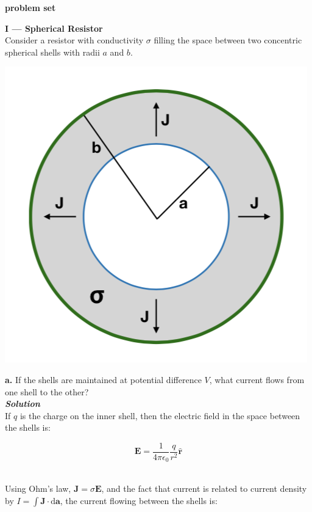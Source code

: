 \documentclass[9pt]{extarticle}
\renewcommand{\v}[1]{{\bm #1}}
\newcommand{\hv}[1]{\hat{\bm{#1}}}
\newcommand{\bfit}[1]{\textbf{\textit{#1}}}
\renewcommand{\d}{\text{d}}
\newcommand{\eo}{\epsilon_0}
\begin{document}
\setlength{\parindent}{0pt}

{\huge \bf problem set} 

\noindent \hrulefill

\begin{multicols*}{2}

{\LARGE \bf I --- Spherical Resistor} \\

Consider a resistor with conductivity $\sigma$ filling the space between two concentric spherical shells with radii $a$ and $b$. \\ 

\begin{center}
	\includegraphics[scale=0.5]{ps7-pic1.png}
\end{center}

{\Large \bf a.} If the shells are maintained at potential difference $V$, what current flows from one shell to the other? \\ 

{\bfit{Solution}} \\ 

If $q$ is the charge on the inner shell, then the electric field in the space between the shells is:

$$\v E = \frac{1}{4\pi\eo} \frac{q}{r^2} \hv r$$ \ 

Using Ohm's law, $\v J = \sigma \v E$, and the fact that current is related to current density by $I = \int \v J \cdot \d \v a$, the current flowing between the shells is:


\end{multicols*}
\end{document}
